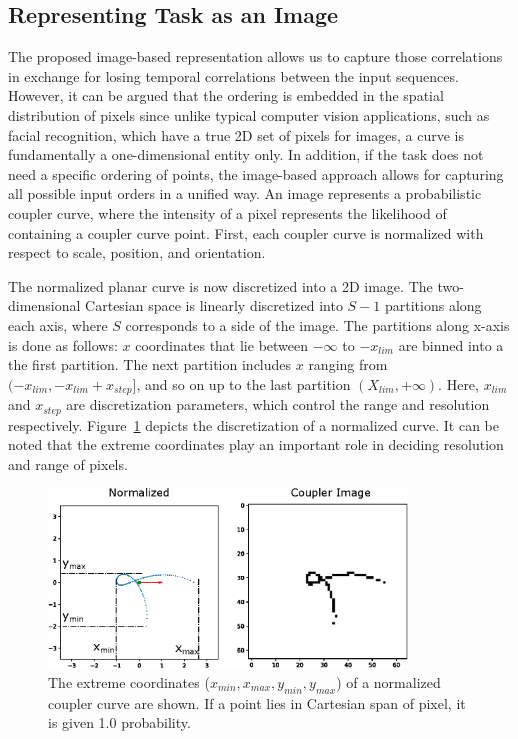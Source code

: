 \subsection{Representing Task as an Image}\label{sec_image_representation}

The proposed image-based representation allows us to capture those correlations in exchange for losing temporal correlations between the input sequences.
However, it can be argued that the ordering is embedded in the spatial distribution of pixels since unlike typical computer vision applications, such as facial recognition, which have a true 2D set of pixels for images, a curve is fundamentally a one-dimensional entity only. In addition, if the task does not need a specific ordering of points, the image-based approach allows for capturing all possible input orders in a unified way. An image represents a probabilistic coupler curve, where the intensity of a pixel represents the likelihood of containing a coupler curve point. First, each coupler curve is normalized with respect to scale, position, and orientation.


The normalized planar curve is now discretized into a 2D image. The two-dimensional Cartesian space is linearly discretized into $S-1$ partitions along each axis, where $S$ corresponds to a side of the image.
The partitions along x-axis is done as follows:
$x$ coordinates that lie between $-\infty$ to $-x_{lim}$ are binned into a the first partition. The next partition includes $x$ ranging from $(-x_{lim}, -x_{lim} + x_{step}]$, and so on up to the last partition $(X_{lim}, +\infty)$. Here, $x_{lim}$ and $x_{step}$ are discretization parameters, which control the range and resolution respectively. Figure~\ref{fig_curve_discretization} depicts the discretization of a normalized curve. It can be noted that the extreme coordinates play an important role in deciding resolution and range of pixels. 


\begin{figure}
\centering
\includegraphics[width=270pt]{idetc-20/figure/fig_curve_discretization.eps}
  \caption{The extreme coordinates ($x_{min}, x_{max}, y_{min}, y_{max}$) of a normalized coupler curve are shown. If a point lies in Cartesian span of pixel, it is given 1.0 probability.}
\label{fig_curve_discretization}
\end{figure}


